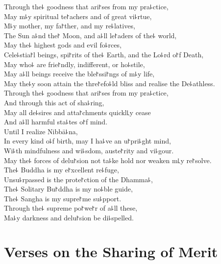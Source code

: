 Through the꜕ goodness that ari꜓ses from my pra꜕ctice,\\
May m꜕y spiritual te꜓achers and  of great vi꜕rtue,\\
M꜕y mother, my fa꜓ther, and my re꜕latives,\\
The Sun a꜕nd the꜓ Moon, and a꜕ll  le꜓aders of the꜕ world,\\
May the꜕ highest gods and evil fo꜕rces,\\
Cele꜕stia꜓l beings,  spi꜓rits of the꜕ Earth, and the Lo꜕rd o꜓f Death,\\
May  who꜕ are frie꜓ndly, indifferent, or ho꜕stile,\\
May a꜕ll beings receive the ble꜓ssi꜓ngs of m꜕y life,\\
May the꜕y soon attain the thre꜓efo꜕ld bliss and realise the De꜕athless.\\
Through the꜕ goodness that ari꜓ses from my pra꜕ctice,\\
And through this act of sha꜕ring,\\
May all de꜕sires and atta꜓chments quickl꜖y cease\\
And a꜕ll harmful sta꜕tes o꜓f mind.\\
Until I realize Nibbā꜕na,\\
In every kind o꜕f birth, may I ha꜕ve an u꜓pri꜕ght mind,\\
Wi꜕th mindfulness and wi꜕sdom, auste꜓rity and vi꜕gour.\\
May the꜕ forces of delu꜓sion not ta꜕ke hold nor weaken m꜖y re꜓solve.\\
The꜕ Buddha is my e꜓xcellent re꜕fuge,\\
Unsu꜕rpassed is the prote꜓ction of the Dhamma꜕,\\
The꜕ Solitary Bu꜓ddha is my no꜕ble guide,\\
The꜕ Sangha is my supre꜓me su꜕pport.\\
Through the꜕ supreme po꜓we꜓r of a꜕ll these,\\
Ma꜕y darkness and delu꜓sion be di꜕spelled.

\chapter[Sharing of Merit]{Verses on the Sharing of Merit}%


\begin{leader}
\end{leader}

